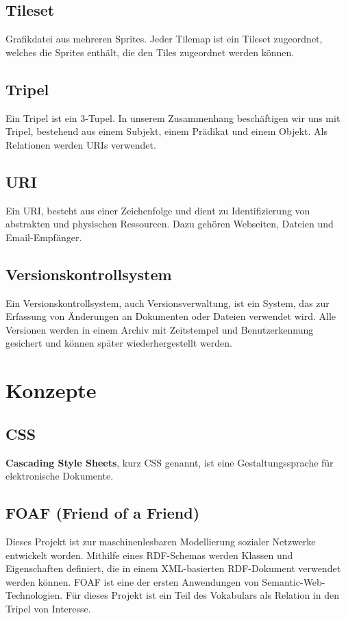 \documentclass[11pt,a4paper]{article}
\begin{document}
\subsection{Tileset}
Grafikdatei aus mehreren Sprites. Jeder Tilemap ist ein Tileset zugeordnet, welches die Sprites enthält,
die den Tiles zugeordnet werden können.
\subsection{Tripel}
Ein Tripel ist ein 3-Tupel. In unserem Zusammenhang beschäftigen wir uns mit Tripel, bestehend aus einem Subjekt, einem Prädikat und einem Objekt. Als Relationen werden URIs verwendet.
\subsection{URI}
Ein URI, besteht aus einer  Zeichenfolge und dient zu Identifizierung von abstrakten und physischen  Ressourcen. Dazu gehören Webseiten, Dateien und Email-Empfänger.
\subsection{Versionskontrollsystem}
Ein Versionskontrollsystem, auch Versionsverwaltung, ist ein System, das zur Erfassung von Änderungen an Dokumenten oder Dateien verwendet wird. Alle Versionen werden in einem Archiv mit Zeitstempel und Benutzerkennung gesichert und können später wiederhergestellt werden.


\clearpage
\section{Konzepte}
\subsection{CSS}
\textbf{Cascading Style Sheets}, kurz CSS genannt, ist eine Gestaltungssprache für elektronische Dokumente.
\subsection{FOAF (Friend of a Friend)}
Dieses  Projekt ist zur maschinenlesbaren Modellierung sozialer Netzwerke  entwickelt worden. Mithilfe eines RDF-Schemas werden Klassen und  Eigenschaften definiert, die in einem XML-basierten RDF-Dokument  verwendet werden können. FOAF ist eine der ersten Anwendungen von  Semantic-Web-Technologien.
Für dieses Projekt ist ein Teil des Vokabulars als Relation in den Tripel von Interesse.
\end{document}
